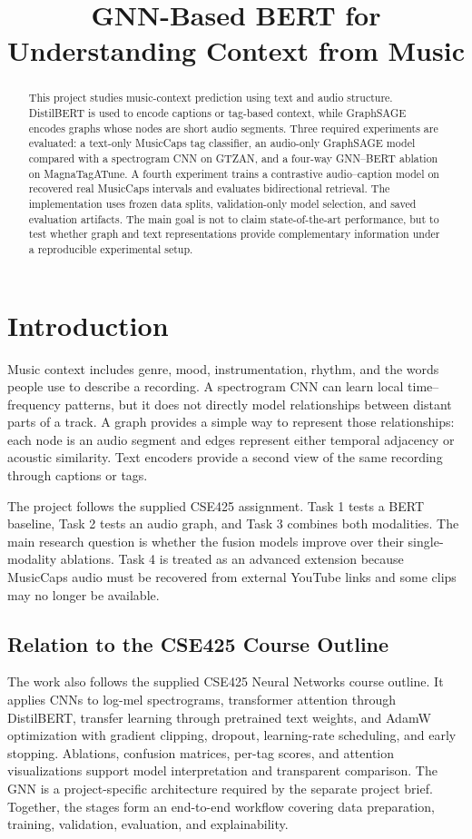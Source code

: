 \documentclass[conference]{IEEEtran}
\title{GNN-Based BERT for Understanding Context from Music}
\author{
\IEEEauthorblockN{
\begin{tabular}{cc}
Kazi Salman Salim & Miskatul Afrin Anika
\end{tabular}}
\IEEEauthorblockA{
\begin{tabular}{cc}
Student ID: 23101209 & Student ID: 23101409 \\
Section: 3 & Section: 3
\end{tabular}\\
Course: CSE425 --- Neural Networks\\
Course Instructor: Moin Mostakim}}
\begin{document}
\maketitle

\begin{abstract}
This project studies music-context prediction using text and audio structure. DistilBERT is
used to encode captions or tag-based context, while GraphSAGE encodes graphs whose nodes are
short audio segments. Three required experiments are evaluated: a text-only MusicCaps tag
classifier, an audio-only GraphSAGE model compared with a spectrogram CNN on GTZAN, and a
  four-way GNN--BERT ablation on MagnaTagATune. A fourth experiment trains a contrastive
  audio--caption model on recovered real MusicCaps intervals and evaluates bidirectional retrieval.
  The implementation uses frozen data splits, validation-only model selection, and saved evaluation
  artifacts. The main goal is not to claim
state-of-the-art performance, but to test whether graph and text representations provide
complementary information under a reproducible experimental setup.
\end{abstract}

\section{Introduction}
Music context includes genre, mood, instrumentation, rhythm, and the words people use to
describe a recording. A spectrogram CNN can learn local time--frequency patterns, but it does
not directly model relationships between distant parts of a track. A graph provides a simple
way to represent those relationships: each node is an audio segment and edges represent either
temporal adjacency or acoustic similarity. Text encoders provide a second view of the same
recording through captions or tags.

The project follows the supplied CSE425 assignment. Task 1 tests a BERT baseline, Task 2 tests
an audio graph, and Task 3 combines both modalities. The main research question is whether the
fusion models improve over their single-modality ablations. Task 4 is treated as an advanced
extension because MusicCaps audio must be recovered from external YouTube links and some clips
may no longer be available.
\subsection{Relation to the CSE425 Course Outline}
The work also follows the supplied CSE425 Neural Networks course outline. It applies CNNs to
log-mel spectrograms, transformer attention through DistilBERT, transfer learning through
pretrained text weights, and AdamW optimization with gradient clipping, dropout, learning-rate
scheduling, and early stopping. Ablations, confusion matrices, per-tag scores, and attention
visualizations support model interpretation and transparent comparison. The GNN is a
project-specific architecture required by the separate project brief. Together, the stages form
an end-to-end workflow covering data preparation, training, validation, evaluation, and
explainability.
\end{document}
